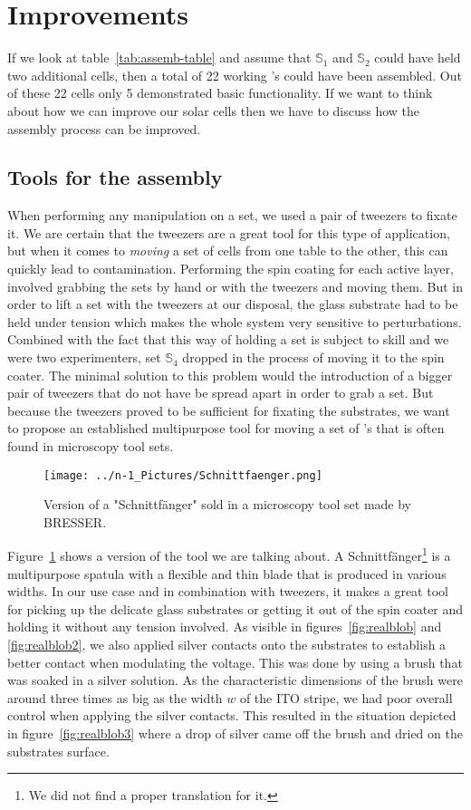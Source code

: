
\section{Improvements}\label{sec:improvements}
If we look at table~\ref{tab:assemb-table} and assume that $\mathbb{S}_1$ and $\mathbb{S}_2$ could have held two additional cells, then a total of 22 working \BHSC’s could have been assembled. Out of these 22 cells only 5 demonstrated basic functionality. If we want to think about how we can improve our solar cells then we have to discuss how the assembly process can be improved.

\subsection{Tools for the assembly}
When performing any manipulation on a set, we used a pair of tweezers to fixate it. We are certain that the tweezers are a great tool for this type of application, but when it comes to \emph{moving} a set of cells from one table to the other, this can quickly lead to contamination. Performing the spin coating for each active layer, involved grabbing the sets by hand or with the tweezers and moving them. But in order to lift a set with the tweezers at our disposal, the glass substrate had to be held under tension which makes the whole system very sensitive to perturbations. Combined with the fact that this way of holding a set is subject to skill and we were two experimenters, set $\mathbb{S}_4$ dropped in the process of moving it to the spin coater.\mypar
The minimal solution to this problem would the introduction of a bigger pair of tweezers that do not have be spread apart in order to grab a set. But because the tweezers proved to be sufficient for fixating the substrates, we want to propose an established multipurpose tool for moving a set of \BHSC's that is often found in microscopy tool sets.

\begin{figure}[h]\centering
\texttt{[image: ../n-1\_Pictures/Schnittfaenger.png]}
\caption{Version of a "Schnittfänger" sold in a microscopy tool set made by BRESSER.}
\label{fig:cutcatcher}
\end{figure}
Figure~\ref{fig:cutcatcher} shows a version of the tool we are talking about. A Schnittfänger\footnote{We did not find a proper translation for it.} is a multipurpose spatula with a flexible and thin blade that is produced in various widths. In our use case and in combination with tweezers, it makes a great tool for picking up the delicate glass substrates or getting it out of the spin coater and holding it without any tension involved.\mypar
As visible in figures~\ref{fig:realblob} and \ref{fig:realblob2}, we also applied silver contacts onto the substrates to establish a better contact when modulating the voltage. This was done by using a brush that was soaked in a silver solution. As the characteristic dimensions of the brush were around three times as big as the width $w$ of the ITO stripe, we had poor overall control when applying the silver contacts. This resulted in the situation depicted in figure~\ref{fig:realblob3} where a drop of silver came off the brush and dried on the substrates surface.

